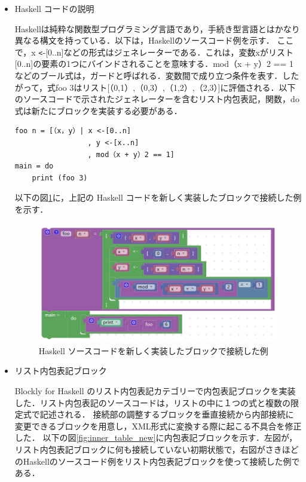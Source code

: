 \documentclass{risepaper}
\begin{document}
\begin{itemize}

\item Haskell コードの説明

Haskellは純粋な関数型プログラミング言語であり，手続き型言語とはかなり異なる構文を持っている．以下は，Haskellのソースコード例を示す．
ここで，x \verb|<|-[0..n]などの形式はジェネレーターである．これは，変数xがリスト[0..n]の要素の1つにバインドされることを意味する．mod（x + y）2 == 1などのブール式は，ガードと呼ばれる．変数間で成り立つ条件を表す．したがって，式foo 3はリスト[（0,1）,（0,3）,（1,2）,（2,3）]に評価される．以下のソースコードで示されたジェネレーターを含むリスト内包表記，関数，do式は新たにブロックを実装する必要がある．

\begin{lstlisting}[basicstyle=\ttfamily\footnotesize]
foo n = [（x，y）| x <-[0..n]
                 , y <-[x..n]
                 , mod（x + y）2 == 1]
main = do
    print (foo 3)
\end{lstlisting}

以下の図\ref{fig:haskell_blocks_example}に，上記の Haskell コードを新しく実装したブロックで接続した例を示す．

\begin{figure}[h]
\begin{center}
\includegraphics[scale=0.8]{img/haskell_blocks_example.PNG}
\caption{Haskell ソースコードを新しく実装したブロックで接続した例}%
\label{fig:haskell_blocks_example}
\end{center}%
\end{figure}%

\item リスト内包表記ブロック

Blockly for Haskell のリスト内包表記カテゴリーで内包表記ブロックを実装した．リスト内包表記のソースコードは，リストの中に１つの式と複数の限定式で記述される．
接続部の調整するブロックを垂直接続から内部接続に変更できるブロックを用意し，XML形式に変換する際に起こる不具合を修正した．
以下の図\ref{fig:inner_table_new}に内包表記ブロックを示す．左図が，リスト内包表記ブロックに何も接続していない初期状態で，右図がさきほどのHaskellのソースコード例をリスト内包表記ブロックを使って接続した例である．



\end{itemize}
\end{document}
